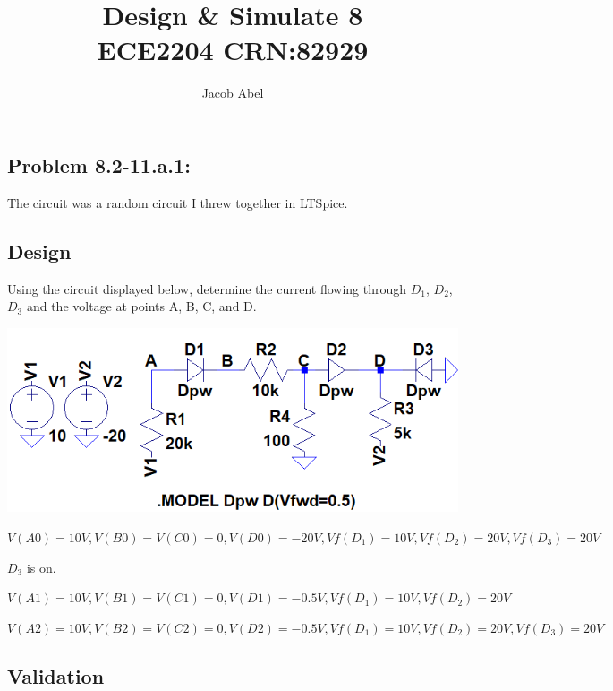 \documentclass[12pt,letterpaper,titlepage]{article}
\author{Jacob Abel}
\title{	Design \& Simulate 8
	\\\large ECE2204 CRN:82929
}
\begin{document}
\maketitle
\begin{raggedright}

\section{Problem 8.2-11.a.1: } The circuit was a random circuit I threw together in LTSpice.
\subsection{Design}
Using the circuit displayed below, determine the current flowing through $D_1$, $D_2$, $D_3$ and the voltage at points A, B, C, and D.

\begin{center}
\includegraphics[width=\textwidth, height=9\baselineskip, keepaspectratio=true]{ds1}
\end{center}

$V(A0) = 10V, V(B0) = V(C0) = 0, V(D0) = -20V, 
Vf(D_1) = 10V, Vf(D_2) = 20V, Vf(D_3) = 20V$

$D_3$ is on.

$V(A1) = 10V, V(B1) = V(C1) = 0, V(D1) = -0.5V, 
Vf(D_1) = 10V, Vf(D_2) = 20V$


$V(A2) = 10V, V(B2) = V(C2) = 0, V(D2) = -0.5V, 
Vf(D_1) = 10V, Vf(D_2) = 20V, Vf(D_3) = 20V$

\subsection{Validation}


\end{raggedright}
\end{document}

